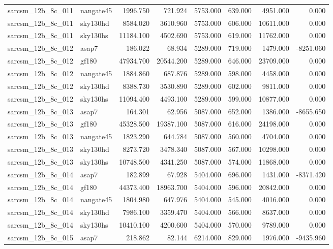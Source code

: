 \begin{tabular}{llrrrrrr}
sarcsm\_12b\_8c\_011 & nangate45 & 1996.750 & 721.924 & 5753.000 & 639.000 & 4951.000 & 0.000 \\
sarcsm\_12b\_8c\_011 & sky130hd & 8584.020 & 3610.960 & 5753.000 & 606.000 & 10611.000 & 0.000 \\
sarcsm\_12b\_8c\_011 & sky130hs & 11184.100 & 4502.690 & 5753.000 & 619.000 & 11762.000 & 0.000 \\
sarcsm\_12b\_8c\_012 & asap7 & 186.022 & 68.934 & 5289.000 & 719.000 & 1479.000 & -8251.060 \\
sarcsm\_12b\_8c\_012 & gf180 & 47934.700 & 20544.200 & 5289.000 & 646.000 & 23709.000 & 0.000 \\
sarcsm\_12b\_8c\_012 & nangate45 & 1884.860 & 687.876 & 5289.000 & 598.000 & 4458.000 & 0.000 \\
sarcsm\_12b\_8c\_012 & sky130hd & 8388.730 & 3530.890 & 5289.000 & 602.000 & 9811.000 & 0.000 \\
sarcsm\_12b\_8c\_012 & sky130hs & 11094.400 & 4493.100 & 5289.000 & 599.000 & 10877.000 & 0.000 \\
sarcsm\_12b\_8c\_013 & asap7 & 164.301 & 62.956 & 5087.000 & 652.000 & 1386.000 & -8655.650 \\
sarcsm\_12b\_8c\_013 & gf180 & 45328.500 & 19387.100 & 5087.000 & 616.000 & 24198.000 & 0.000 \\
sarcsm\_12b\_8c\_013 & nangate45 & 1823.290 & 644.784 & 5087.000 & 560.000 & 4704.000 & 0.000 \\
sarcsm\_12b\_8c\_013 & sky130hd & 8273.720 & 3478.340 & 5087.000 & 567.000 & 10298.000 & 0.000 \\
sarcsm\_12b\_8c\_013 & sky130hs & 10748.500 & 4341.250 & 5087.000 & 574.000 & 11868.000 & 0.000 \\
sarcsm\_12b\_8c\_014 & asap7 & 182.899 & 67.928 & 5404.000 & 696.000 & 1431.000 & -8371.420 \\
sarcsm\_12b\_8c\_014 & gf180 & 44373.400 & 18963.700 & 5404.000 & 596.000 & 20842.000 & 0.000 \\
sarcsm\_12b\_8c\_014 & nangate45 & 1804.980 & 647.976 & 5404.000 & 545.000 & 4016.000 & 0.000 \\
sarcsm\_12b\_8c\_014 & sky130hd & 7986.100 & 3359.470 & 5404.000 & 566.000 & 8637.000 & 0.000 \\
sarcsm\_12b\_8c\_014 & sky130hs & 10410.100 & 4200.600 & 5404.000 & 570.000 & 9789.000 & 0.000 \\
sarcsm\_12b\_8c\_015 & asap7 & 218.862 & 82.144 & 6214.000 & 829.000 & 1976.000 & -9435.960 \\

\end{tabular}
